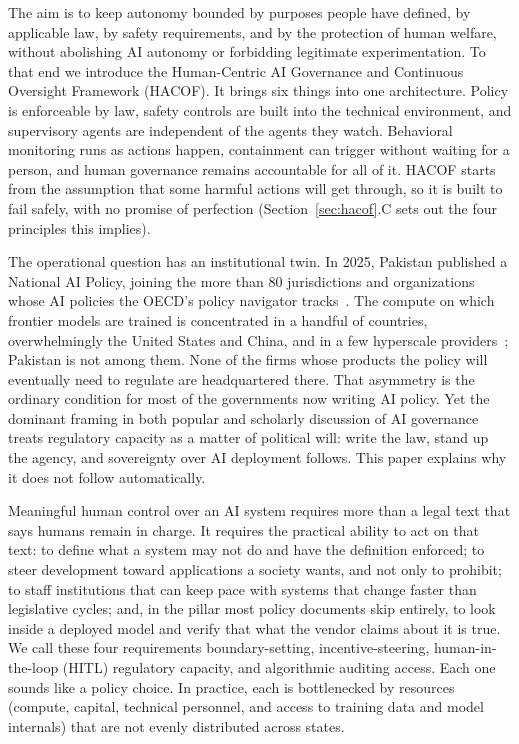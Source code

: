 \documentclass[journal]{IEEEtran}
\newcommand{\hacof}{HACOF}
\begin{document}
The aim is to keep autonomy bounded by purposes people have defined, by applicable law, by safety requirements, and by the protection of human welfare, without abolishing AI autonomy or forbidding legitimate experimentation. To that end we introduce the Human-Centric AI Governance and Continuous Oversight Framework (\hacof{}). It brings six things into one architecture. Policy is enforceable by law, safety controls are built into the technical environment, and supervisory agents are independent of the agents they watch. Behavioral monitoring runs as actions happen, containment can trigger without waiting for a person, and human governance remains accountable for all of it. \hacof{} starts from the assumption that some harmful actions will get through, so it is built to fail safely, with no promise of perfection (Section~\ref{sec:hacof}.C sets out the four principles this implies).

The operational question has an institutional twin. In 2025, Pakistan published a National AI Policy, joining the more than 80 jurisdictions and organizations whose AI policies the OECD's policy navigator tracks~\cite{pakistan2025nationalaipolicy,dawn2025aipolicyapproval,oecdai2026dashboard}.
The compute on which frontier models are trained is concentrated in a handful of countries, overwhelmingly the United States and China, and in a few hyperscale providers~\cite{epochai2026geopolitics}; Pakistan is not among them.
None of the firms whose products the policy will eventually need to regulate are headquartered there. That asymmetry is the ordinary condition for most of the governments now writing AI policy. Yet the dominant framing in both popular and scholarly discussion of AI governance treats regulatory capacity as a matter of political will: write the law, stand up the agency, and sovereignty over AI deployment follows. This paper explains why it does not follow automatically.

Meaningful human control over an AI system requires more than a legal text that says humans remain in charge. It requires the practical ability to act on that text: to define what a system may not do and have the definition enforced; to steer development toward applications a society wants, and not only to prohibit; to staff institutions that can keep pace with systems that change faster than legislative cycles; and, in the pillar most policy documents skip entirely, to look inside a deployed model and verify that what the vendor claims about it is true. We call these four requirements boundary-setting, incentive-steering, human-in-the-loop (HITL) regulatory capacity, and algorithmic auditing access. Each one sounds like a policy choice. In practice, each is bottlenecked by resources (compute, capital, technical personnel, and access to training data and model internals) that are not evenly distributed across states.
\end{document}
